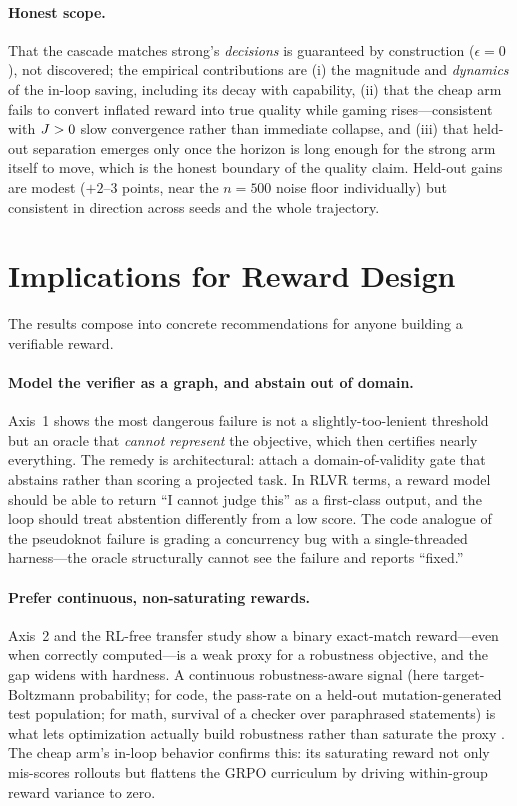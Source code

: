 \paragraph{Honest scope.} That the cascade matches strong's \emph{decisions} is guaranteed by construction
($\epsilon{=}0$), not discovered; the empirical contributions are (i) the magnitude and \emph{dynamics} of the
in-loop saving, including its decay with capability, (ii) that the cheap arm fails to convert inflated reward
into true quality while gaming rises---consistent with $J>0$ slow convergence rather than immediate collapse,
and (iii) that held-out separation emerges only once the horizon is long enough for the strong arm itself to
move, which is the honest boundary of the quality claim. Held-out gains are modest ($+2$--$3$ points, near the
$n{=}500$ noise floor individually) but consistent in direction across seeds and the whole trajectory.

\section{Implications for Reward Design}
The results compose into concrete recommendations for anyone building a verifiable reward.

\paragraph{Model the verifier as a graph, and abstain out of domain.} Axis~1 shows the most dangerous failure
is not a slightly-too-lenient threshold but an oracle that \emph{cannot represent} the objective, which then
certifies nearly everything. The remedy is architectural: attach a domain-of-validity gate that abstains
rather than scoring a projected task. In RLVR terms, a reward model should be able to return ``I cannot judge
this'' as a first-class output, and the loop should treat abstention differently from a low score. The code
analogue of the pseudoknot failure is grading a concurrency bug with a single-threaded harness---the oracle
structurally cannot see the failure and reports ``fixed.''

\paragraph{Prefer continuous, non-saturating rewards.} Axis~2 and the RL-free transfer study show a binary
exact-match reward---even when correctly computed---is a weak proxy for a robustness objective, and the gap
widens with hardness. A continuous robustness-aware signal (here target-Boltzmann probability; for code, the
pass-rate on a held-out mutation-generated test population; for math, survival of a checker over paraphrased
statements) is what lets optimization actually build robustness rather than saturate the proxy
\citep{gao2023overoptimization}. The cheap arm's in-loop behavior confirms this: its saturating reward not
only mis-scores rollouts but flattens the GRPO curriculum by driving within-group reward variance to zero.

